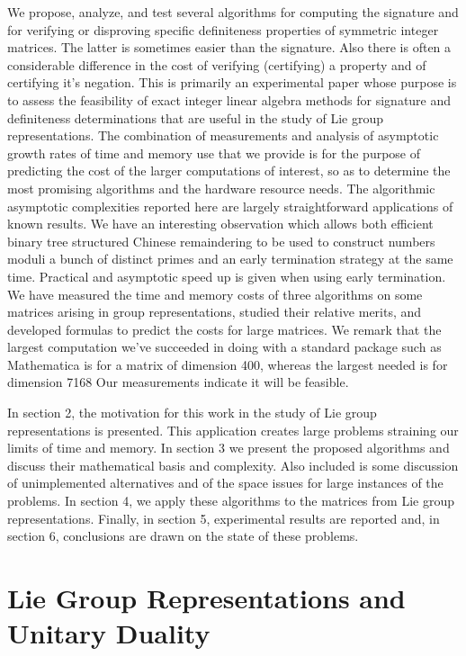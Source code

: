 \documentclass{acm_proc_article-sp}
\begin{document}
We propose, analyze, and test several algorithms for 
computing the signature and for verifying or disproving specific
definiteness properties of symmetric integer matrices.  
The latter is sometimes easier than the signature.  
Also there is often a considerable difference in the 
cost of verifying (certifying) a property and of certifying it's negation.
This is primarily an experimental paper whose purpose is to assess the feasibility 
of exact integer linear algebra methods for signature and definiteness determinations
that are useful in the study of Lie group representations.
The combination of measurements and analysis of asymptotic growth rates of time
and memory use that we provide is for the purpose of predicting the cost of the larger
computations of interest, so as to determine the most promising algorithms and the 
hardware resource needs.
The algorithmic asymptotic complexities reported here are largely straightforward 
applications of known results. 
We have an interesting observation which
allows both efficient binary tree structured Chinese remaindering to be used to construct 
numbers moduli a bunch of distinct primes and an early termination strategy at the same time.
Practical and asymptotic speed up is given when using early termination.
We have measured the time and memory costs of three algorithms on some matrices arising
in group representations, 
studied their relative merits, and developed formulas to predict the costs for large matrices.
We remark that the largest computation we've succeeded in doing with
a standard package such as Mathematica is for a matrix of dimension
400, whereas the largest needed is for dimension 7168  Our measurements 
indicate it will be feasible.

In section 2, the motivation for this work in the study of Lie group
representations is presented.  This application creates large problems
straining our limits of time and memory.
In section 3 we present the proposed algorithms and discuss their mathematical
basis and complexity.
Also included is some discussion
of unimplemented alternatives and of the space issues for large instances
of the problems. In section 4, we apply these algorithms to the matrices from 
Lie group representations.
Finally, in section 5, experimental results are reported
and, in section 6, conclusions are drawn on the state of these problems.

\section{Lie Group Representations and Unitary Duality}
\end{document}

